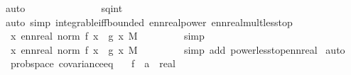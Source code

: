 \begin{isabellebody}
\ auto\isanewline
\ \ \isamarkupfalse%
\ \isamarkupfalse%
\ {\isachardoublequoteopen}{\isachardot}{\kern0pt}{\isachardot}{\kern0pt}{\isachardot}{\kern0pt}\ {\isacharless}{\kern0pt}\ {\isasyminfinity}{\isachardoublequoteclose}\ \isanewline
\ \ \ \ \isamarkupfalse%
\ sq{\isacharunderscore}{\kern0pt}int\ \isamarkupfalse%
\ {\isacharparenleft}{\kern0pt}auto\ simp{\isacharcolon}{\kern0pt}\ integrable{\isacharunderscore}{\kern0pt}iff{\isacharunderscore}{\kern0pt}bounded\ ennreal{\isacharunderscore}{\kern0pt}power\ ennreal{\isacharunderscore}{\kern0pt}mult{\isacharunderscore}{\kern0pt}less{\isacharunderscore}{\kern0pt}top{\isacharparenright}{\kern0pt}\isanewline
\ \ \isamarkupfalse%
\ \isamarkupfalse%
\ {\isachardoublequoteopen}{\isacharparenleft}{\kern0pt}{\isasymintegral}\isactrlsup {\isacharplus}{\kern0pt}\ x{\isachardot}{\kern0pt}\ ennreal\ {\isacharparenleft}{\kern0pt}norm\ {\isacharparenleft}{\kern0pt}f\ x\ {\isacharasterisk}{\kern0pt}\ g\ x{\isacharparenright}{\kern0pt}{\isacharparenright}{\kern0pt}\ {\isasympartial}M{\isacharparenright}{\kern0pt}\ {\isacharless}{\kern0pt}\ {\isasyminfinity}{\isachardoublequoteclose}\ \isanewline
\ \ \ \ \isamarkupfalse%
\ simp\isanewline
\ \ \isamarkupfalse%
\ {\isachardoublequoteopen}{\isacharparenleft}{\kern0pt}{\isasymintegral}\isactrlsup {\isacharplus}{\kern0pt}\ x{\isachardot}{\kern0pt}\ ennreal\ {\isacharparenleft}{\kern0pt}norm\ {\isacharparenleft}{\kern0pt}f\ x\ {\isacharasterisk}{\kern0pt}\ g\ x{\isacharparenright}{\kern0pt}{\isacharparenright}{\kern0pt}\ {\isasympartial}M{\isacharparenright}{\kern0pt}\ {\isacharless}{\kern0pt}\ {\isasyminfinity}{\isachardoublequoteclose}\ \isanewline
\ \ \ \ \isamarkupfalse%
\ {\isacharparenleft}{\kern0pt}simp\ add{\isacharcolon}{\kern0pt}\ power{\isacharunderscore}{\kern0pt}less{\isacharunderscore}{\kern0pt}top{\isacharunderscore}{\kern0pt}ennreal{\isacharparenright}{\kern0pt}\isanewline
{}\isamarkupfalse%
\ auto%
\endisatagproof
{\isafoldproof}%
%
\isadelimproof
\isanewline
%
\endisadelimproof
\isanewline
{}\isamarkupfalse%
\ {\isacharparenleft}{\kern0pt}\ prob{\isacharunderscore}{\kern0pt}space{\isacharparenright}{\kern0pt}\ covariance{\isacharunderscore}{\kern0pt}eq{\isacharcolon}{\kern0pt}\isanewline
\ \ \ f\ {\isacharcolon}{\kern0pt}{\isacharcolon}{\kern0pt}\ {\isachardoublequoteopen}{\isacharprime}{\kern0pt}a\ {\isasymRightarrow}\ real{\isachardoublequoteclose}\isanewline

\end{isabellebody}
